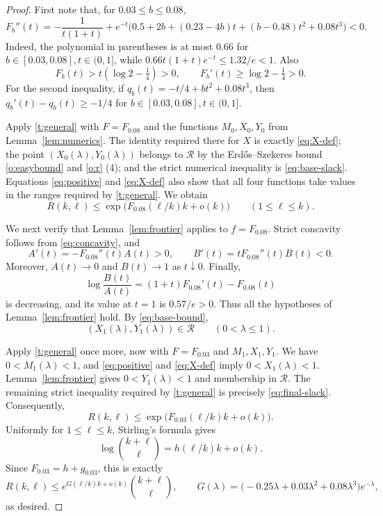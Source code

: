\documentclass[reqno,final,12pt]{amsart}
\newcommand{\mc}[1]{\mathcal{#1}}
\begin{document}
\begin{proof} First note that, for
	$0.03\leq b\leq0.08$,
	\begin{equation}\label{eq:concavity}
		F_b''(t)=-\frac1{t(1+t)}+e^{-t}\bigl(
		0.5+2b+(0.23-4b)t+(b-0.48)t^2+0.08t^3\bigr)<0.
	\end{equation}
	Indeed, the polynomial in parentheses is at most $0.66$ for $b \in  [0.03, 0.08], t \in (0,1]$, while
	$0.66t(1+t)e^{-t} \leq 1.32/e<1$.  Also
	\begin{equation}\label{eq:positive}
		F_b(t)>t(\log2-\tfrac14)>0,
		\qquad F_b'(t)\geq\log2-\tfrac14>0.
	\end{equation}
	For the second inequality, if
	$q_b(t)=-t/4+bt^2+0.08t^3$, then
	$q_b'(t)-q_b(t)\geq-1/4$ for $b \in  [0.03, 0.08], t \in (0,1]$.
	
	Apply \cref{t:general} with $F=F_{0.08}$ and the functions $M_0,X_0,Y_0$
	from Lemma~\ref{lem:numerics}.  The identity required there for $X$
	is exactly \eqref{eq:X-def}; the point $(X_0 (\lambda),Y_0 (\lambda))$ belongs to $\mc{R}$ by
	the Erd\H{o}s--Szekeres bound \cref{o:easybound} and \cref{o:r} (4); and the strict numerical inequality is
	\eqref{eq:base-slack}.  Equations \eqref{eq:positive} and
	\eqref{eq:X-def} also show that all four functions take values in the
	ranges required by \cref{t:general}.  We obtain
	\begin{equation}\label{eq:base-bound}
		R(k,\ell)\leq
		\exp\bigl(F_{0.08}(\ell/k)k+o(k)\bigr)
		\qquad(1\leq\ell\leq k).
	\end{equation}
	
	We next verify that Lemma~\ref{lem:frontier} applies to
	$f=F_{0.08}$.  Strict concavity follows from \eqref{eq:concavity}, and
	\[
	A'(t)=-F_{0.08}''(t)A(t)>0,\qquad
	B'(t)=tF_{0.08}''(t)B(t)<0.
	\]
	Moreover, $A(t)\to0$ and $B(t)\to1$ as $t\downarrow0$.  Finally,
	\[
	\log\frac{B(t)}{A(t)}=(1+t)F_{0.08}'(t)-F_{0.08}(t)
	\]
	is decreasing, and its value at $t=1$ is $0.57/e>0$.  Thus all the
	hypotheses of Lemma~\ref{lem:frontier} hold.  By
	\eqref{eq:base-bound},
	\[
	(X_1(\lambda),Y_1(\lambda))\in\mc{R}
	\qquad(0<\lambda\leq1).
	\]
	
	Apply \cref{t:general} once more, now with
	$F=F_{0.03}$ and $M_1,X_1,Y_1$.  We have $0<M_1(\lambda)<1$, and
	\eqref{eq:positive} and \eqref{eq:X-def} imply
	$0<X_1(\lambda)<1$.  Lemma~\ref{lem:frontier} gives
	$0<Y_1(\lambda)<1$ and membership in $\mc{R}$.  The remaining strict
	inequality required by \cref{t:general} is precisely
	\eqref{eq:final-slack}.  Consequently,
	\[
	R(k,\ell)\leq
	\exp\bigl(F_{0.03}(\ell/k)k+o(k)\bigr).
	\]
	Uniformly for $1\leq\ell\leq k$, Stirling's formula gives
	\[
	\log\binom{k+\ell}{\ell}
	=h(\ell/k)k+o(k).
	\]
	Since $F_{0.03}=h+g_{0.03}$, this is exactly
	\[
	R(k,\ell)\leq
	e^{G(\ell/k)k+o(k)}\binom{k+\ell}{\ell},
	\qquad
	G(\lambda)=\bigl(-0.25\lambda+0.03\lambda^2
	+0.08\lambda^3\bigr)e^{-\lambda},
	\]
	as desired.
\end{proof}
\end{document}
